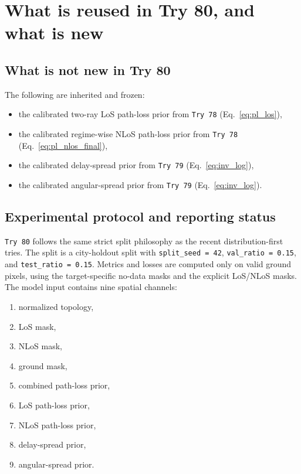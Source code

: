 \documentclass[11pt,a4paper]{article}
\begin{document}
\section{What is reused in Try 80, and what is new}

\subsection{What is not new in Try 80}

The following are inherited and frozen:

\begin{itemize}
\item the calibrated two-ray LoS path-loss prior from \texttt{Try 78}
      (Eq.~\ref{eq:pl_los}),
\item the calibrated regime-wise NLoS path-loss prior from \texttt{Try 78}
      (Eq.~\ref{eq:pl_nlos_final}),
\item the calibrated delay-spread prior from \texttt{Try 79}
      (Eq.~\ref{eq:inv_log}),
\item the calibrated angular-spread prior from \texttt{Try 79}
      (Eq.~\ref{eq:inv_log}).
\end{itemize}

\subsection{Experimental protocol and reporting status}

\texttt{Try 80} follows the same strict split philosophy as the recent
distribution-first tries. The split is a city-holdout split with
\texttt{split\_seed = 42}, \texttt{val\_ratio = 0.15}, and
\texttt{test\_ratio = 0.15}. Metrics and losses are computed only on valid
ground pixels, using the target-specific no-data masks and the explicit
LoS/NLoS masks. The model input contains nine spatial channels:

\begin{enumerate}
\item normalized topology,
\item LoS mask,
\item NLoS mask,
\item ground mask,
\item combined path-loss prior,
\item LoS path-loss prior,
\item NLoS path-loss prior,
\item delay-spread prior,
\item angular-spread prior.
\end{enumerate}
\end{document}
